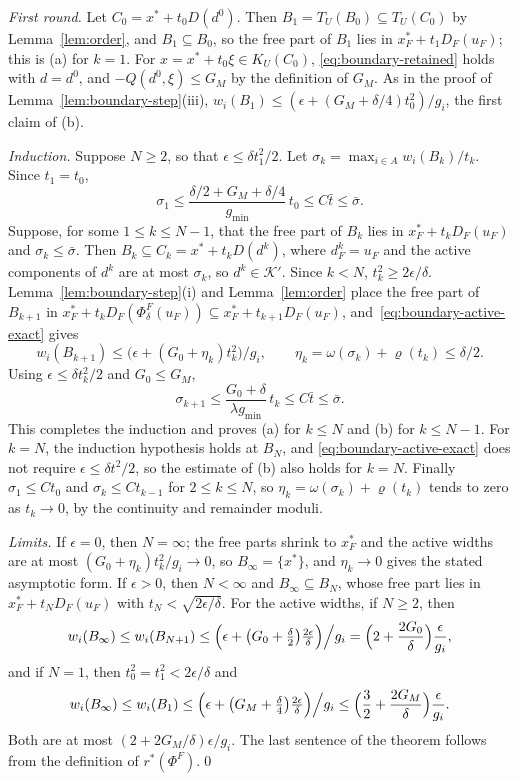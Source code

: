 \emph{First round.} Let $C_0=x^*+t_0D(d^0)$. Then
$B_1=T_U(B_0)\subseteq T_U(C_0)$ by Lemma~\ref{lem:order}, and
$B_1\subseteq B_0$, so the free part of $B_1$ lies in
$x_F^*+t_1D_F(u_F)$; this is (a) for $k=1$. For $x=x^*+t_0\xi\in K_U(C_0)$,
\eqref{eq:boundary-retained} holds with $d=d^0$, and $-Q(d^0,\xi)\le G_M$ by
the definition of $G_M$. As in the proof of
Lemma~\ref{lem:boundary-step}(iii),
$w_i(B_1)\le(\epsilon+(G_M+\delta/4)t_0^2)/g_i$, the first claim of (b).

\emph{Induction.} Suppose $N\ge2$, so that $\epsilon\le\delta t_1^2/2$. Let
$\sigma_k=\max_{i\in A}w_i(B_k)/t_k$. Since $t_1=t_0$,
\[
  \sigma_1\le\frac{\delta/2+G_M+\delta/4}{g_{\min}}\,t_0\le C\bar t\le\bar\sigma.
\]
Suppose, for some $1\le k\le N-1$, that the free part of $B_k$ lies in
$x_F^*+t_kD_F(u_F)$ and $\sigma_k\le\bar\sigma$. Then
$B_k\subseteq C_k=x^*+t_kD(d^k)$, where $d^k_F=u_F$ and the active components
of $d^k$ are at most $\sigma_k$, so $d^k\in\mathcal K'$. Since $k<N$,
$t_k^2\ge2\epsilon/\delta$. Lemma~\ref{lem:boundary-step}(i) and
Lemma~\ref{lem:order} place the free part of $B_{k+1}$ in
$x_F^*+t_kD_F(\Phi^F_\delta(u_F))\subseteq x_F^*+t_{k+1}D_F(u_F)$,
and~\eqref{eq:boundary-active-exact} gives
\[
  w_i(B_{k+1})\le\bigl(\epsilon+(G_0+\eta_k)t_k^2\bigr)/g_i,\qquad
  \eta_k=\omega(\sigma_k)+\varrho(t_k)\le\delta/2.
\]
Using $\epsilon\le\delta t_k^2/2$ and $G_0\le G_M$,
\[
  \sigma_{k+1}\le\frac{G_0+\delta}{\lambda g_{\min}}\,t_k\le C\bar t\le\bar\sigma.
\]
This completes the induction and proves (a) for $k\le N$ and (b) for
$k\le N-1$. For $k=N$, the induction hypothesis holds at $B_N$, and
\eqref{eq:boundary-active-exact} does not require $\epsilon\le\delta t^2/2$, so
the estimate of (b) also holds for $k=N$. Finally $\sigma_1\le Ct_0$ and
$\sigma_k\le Ct_{k-1}$ for $2\le k\le N$, so $\eta_k=\omega(\sigma_k)+\varrho(t_k)$
tends to zero as $t_k\to0$, by the continuity and remainder moduli.

\emph{Limits.} If $\epsilon=0$, then $N=\infty$; the free parts shrink to
$x_F^*$ and the active widths are at most $(G_0+\eta_k)t_k^2/g_i\to0$, so
$B_\infty=\{x^*\}$, and $\eta_k\to0$ gives the stated asymptotic form. If
$\epsilon>0$, then $N<\infty$ and $B_\infty\subseteq B_N$, whose free part lies
in $x_F^*+t_ND_F(u_F)$ with $t_N<\sqrt{2\epsilon/\delta}$. For the active
widths, if $N\ge2$, then
\[
  w_i(B_\infty)\le w_i(B_{N+1})\le\Bigl(\epsilon+\bigl(G_0+\tfrac\delta2\bigr)\tfrac{2\epsilon}{\delta}\Bigr)\Big/g_i
  =\Bigl(2+\frac{2G_0}{\delta}\Bigr)\frac{\epsilon}{g_i},
\]
and if $N=1$, then $t_0^2=t_1^2<2\epsilon/\delta$ and
\[
  w_i(B_\infty)\le w_i(B_1)\le\Bigl(\epsilon+\bigl(G_M+\tfrac\delta4\bigr)\tfrac{2\epsilon}{\delta}\Bigr)\Big/g_i
  \le\Bigl(\frac32+\frac{2G_M}{\delta}\Bigr)\frac{\epsilon}{g_i}.
\]
Both are at most $(2+2G_M/\delta)\epsilon/g_i$. The last sentence of the
theorem follows from the definition of $r^*(\Phi^F)$.\qed
